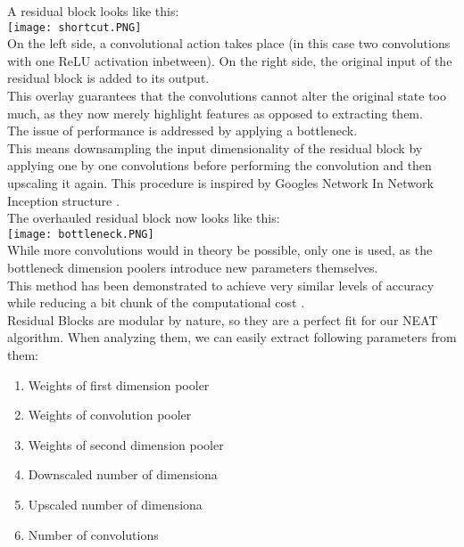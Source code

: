 A residual block looks like this: \\
\texttt{[image: shortcut.PNG]}\\
On the left side, a convolutional action takes place (in this case two convolutions with one ReLU activation inbetween). On the right side, the original input of the residual block is added to its output.\\
This overlay guarantees that the convolutions cannot alter the original state too much, as they now merely highlight features as opposed to extracting them.\\
The issue of performance is addressed by applying a bottleneck.\\
This means downsampling the input dimensionality of the residual block by applying one by one convolutions before performing the convolution and then upscaling it again. This procedure is inspired by Googles Network In Network Inception structure \cite{KaimingHe2015} \cite{Lin2014}.\\
The overhauled residual block now looks like this:\\
\texttt{[image: bottleneck.PNG]}\\
While more convolutions would in theory be possible, only one is used, as the bottleneck dimension poolers introduce new parameters themselves.\\
This method has been demonstrated to achieve very similar levels of accuracy while reducing a bit chunk of the computational cost \cite{KaimingHe2015}.\\
Residual Blocks are modular by nature, so they are a perfect fit for our NEAT algorithm. When analyzing them, we can easily extract following parameters from them:\\
\begin{enumerate}
	\item{Weights of first dimension pooler}
	\item{Weights of convolution pooler}
	\item{Weights of second dimension pooler}
	\item{Downscaled number of dimensiona}
	\item{Upscaled number of dimensiona}
	\item{Number of convolutions}
\end{enumerate}